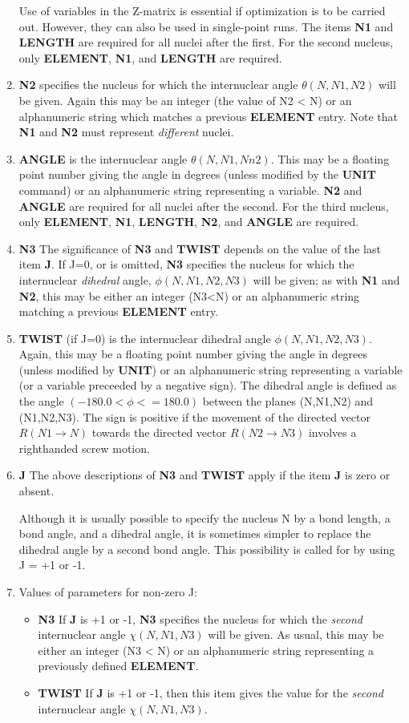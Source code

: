\begin{enumerate}
Use
of variables in the Z-matrix is essential if optimization is to be
carried out. However, they can also be used in single-point runs. The
items {\bf N1} and {\bf LENGTH} are required for all nuclei after the first.
For the second nucleus, only {\bf ELEMENT}, {\bf N1}, and {\bf LENGTH} are
required.
\item {\bf N2} specifies the nucleus for which the internuclear angle
$\theta (N,N1,N2)$ will be given. Again this may be an integer (the value
of N2 < N) or an alphanumeric string which matches a previous {\bf ELEMENT}
entry. Note that {\bf N1} and {\bf N2} must represent {\em different} nuclei.
\item {\bf ANGLE} is the internuclear angle $\theta (N,N1,Nn2).$ 
This may be a
floating point number giving the angle in degrees (unless modified by
the {\bf UNIT} command) or an alphanumeric string representing a variable.
{\bf N2} and {\bf ANGLE} are required for all nuclei after the second. 
For the
third nucleus, only {\bf ELEMENT}, {\bf N1}, {\bf LENGTH},
{\bf N2}, and {\bf ANGLE} are
required.
\item {\bf N3} The significance of {\bf N3} and {\bf TWIST} 
depends on the value of
the last item {\bf J}. If J=0, or is omitted, {\bf N3} specifies the nucleus
for which the internuclear {\em dihedral} angle, $\phi (N,N1,N2,N3)$ will be
given; as with {\bf N1} and {\bf N2}, 
this may be either an  integer (N3<N)  or
an alphanumeric string matching a previous {\bf ELEMENT} entry.
\item {\bf TWIST} (if J=0) is the internuclear dihedral angle
$\phi (N,N1,N2,N3)$. Again, this may be a floating point number giving the
angle in degrees (unless modified by {\bf UNIT}) or an alphanumeric string
representing a variable (or a  variable  preceeded  by a negative
sign). The dihedral angle is defined as the angle 
$(-180.0 < \phi <=180.0)$ 
between the planes (N,N1,N2) and (N1,N2,N3). The sign is
positive if the movement of  the directed vector $R(N1 \rightarrow N)$
towards the
directed  vector $R(N2 \rightarrow N3)$ involves a righthanded screw motion.
\item {\bf J} The above descriptions of 
{\bf N3} and {\bf TWIST} apply if the  item
{\bf J} is zero or absent. 

Although it is usually possible to specify the
nucleus N by a bond length, a bond angle, and a dihedral angle,  it is
sometimes simpler to replace the dihedral angle by a second bond angle.
This possibility is called for by using J = +1 or -1.
\item Values of parameters for non-zero J:
\begin{itemize}
\item {\bf N3} If {\bf J} is +1 or -1, {\bf N3} specifies 
the nucleus for which the
{\em second} internuclear angle 
$\chi (N,N1,N3)$ will be given. As usual, this
may be either an integer (N3 < N) or an alphanumeric string
representing a previously defined {\bf ELEMENT}.
\item {\bf TWIST} If {\bf J } is +1 or -1, 
then this item gives the value for the
{\em second} internuclear angle 
$\chi (N,N1,N3)$. 


\end{itemize}
\end{enumerate}
